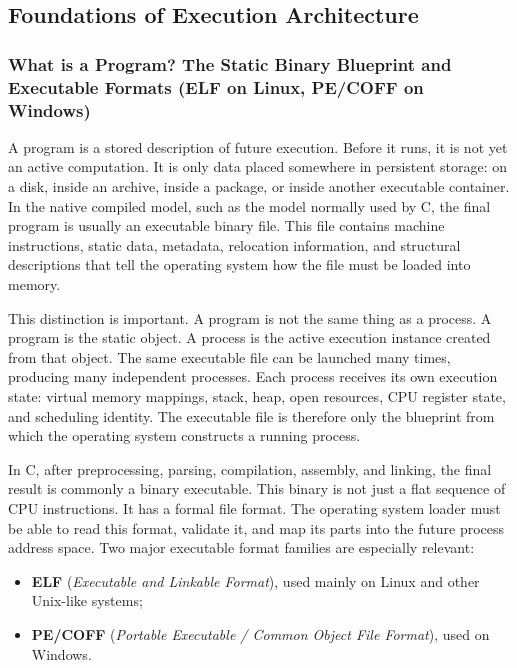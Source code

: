 \documentclass[a4paper,twoside]{report}
\begin{document}
\subsection{Foundations of Execution Architecture}
\subsubsection{What is a Program? The Static Binary Blueprint and Executable Formats (ELF on Linux, PE/COFF on Windows)}

A program is a stored description of future execution. Before it runs, it is not yet an active computation. It is only data placed somewhere in persistent storage: on a disk, inside an archive, inside a package, or inside another executable container. In the native compiled model, such as the model normally used by C, the final program is usually an executable binary file. This file contains machine instructions, static data, metadata, relocation information, and structural descriptions that tell the operating system how the file must be loaded into memory.

This distinction is important. A program is not the same thing as a process. A program is the static object. A process is the active execution instance created from that object. The same executable file can be launched many times, producing many independent processes. Each process receives its own execution state: virtual memory mappings, stack, heap, open resources, CPU register state, and scheduling identity. The executable file is therefore only the blueprint from which the operating system constructs a running process.

In C, after preprocessing, parsing, compilation, assembly, and linking, the final result is commonly a binary executable. This binary is not just a flat sequence of CPU instructions. It has a formal file format. The operating system loader must be able to read this format, validate it, and map its parts into the future process address space. Two major executable format families are especially relevant:

\begin{itemize}
    \item \textbf{ELF} (\emph{Executable and Linkable Format}), used mainly on Linux and other Unix-like systems;
    \item \textbf{PE/COFF} (\emph{Portable Executable / Common Object File Format}), used on Windows.
\end{itemize}
\end{document}
